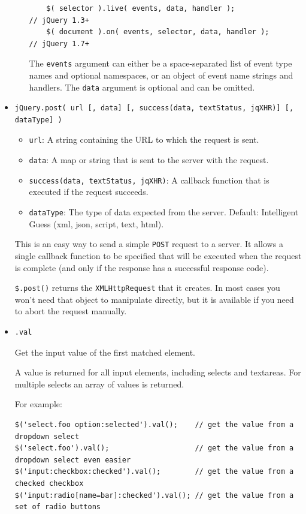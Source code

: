 \begin{itemize}
\begin{itemize}
    \begin{verbatim}
    $( selector ).live( events, data, handler );                // jQuery 1.3+
    $( document ).on( events, selector, data, handler );        // jQuery 1.7+
    \end{verbatim}
    The \verb|events| argument can either be a space-separated list of event
    type names and optional namespaces, or an object of event name
    strings and handlers. The \verb|data| argument is optional and can be
    omitted.
  \end{itemize}
\item
\begin{verbatim}
jQuery.post( url [, data] [, success(data, textStatus, jqXHR)] [, dataType] )
\end{verbatim}
  \begin{itemize}
  \item
  \verb|url|: A string containing the URL to which the request is sent.
  \item
  \verb|data|: A map or string that is sent to the server with the request.
  \item
  \verb|success(data, textStatus, jqXHR)|: A callback function that is executed if the request succeeds.
  \item
  \verb|dataType|: The type of data expected from the server. Default: Intelligent Guess (xml, json, script, text, html).
  \end{itemize}

This is an easy way to send a simple \verb|POST| request to a server.
It allows a single callback function to be specified that will be executed when the
request is complete (and only if the response has a successful
response code).

\verb|$.post()| returns the \verb|XMLHttpRequest| that it creates. In most cases
you won't need that object to manipulate directly, but it is available
if you need to abort the request manually.

\item
\begin{verbatim}
.val
\end{verbatim}

Get the input value of the first matched element.

A value is returned for all input elements, including selects and textareas. 
For multiple selects an array of values is returned.

For example:

\begin{verbatim}
$('select.foo option:selected').val();    // get the value from a dropdown select
$('select.foo').val();                    // get the value from a dropdown select even easier
$('input:checkbox:checked').val();        // get the value from a checked checkbox
$('input:radio[name=bar]:checked').val(); // get the value from a set of radio buttons
\end{verbatim}



\end{itemize}
